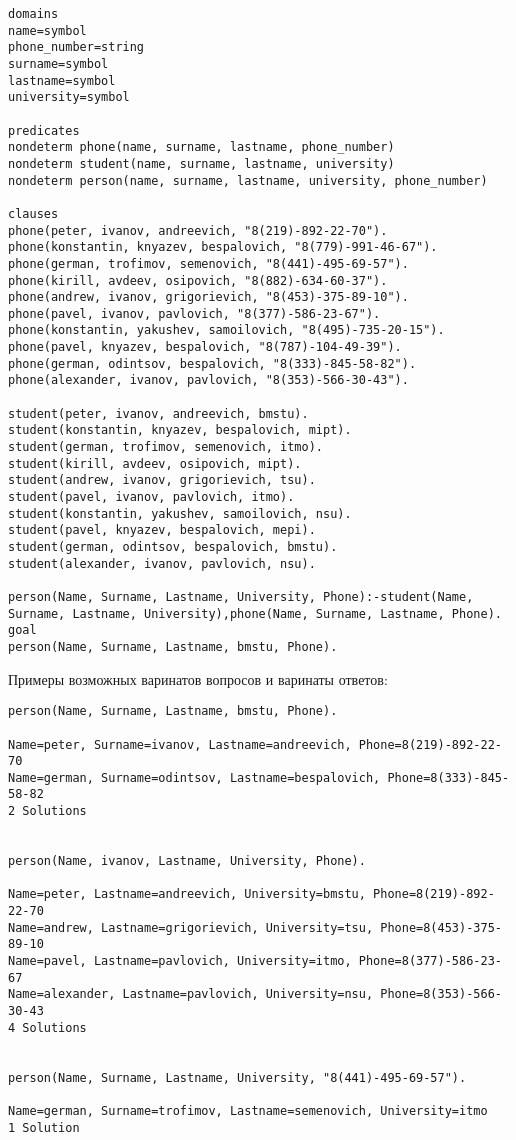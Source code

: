 \begin{lstlisting}
domains
name=symbol
phone_number=string
surname=symbol
lastname=symbol
university=symbol

predicates
nondeterm phone(name, surname, lastname, phone_number)
nondeterm student(name, surname, lastname, university)
nondeterm person(name, surname, lastname, university, phone_number)

clauses
phone(peter, ivanov, andreevich, "8(219)-892-22-70").
phone(konstantin, knyazev, bespalovich, "8(779)-991-46-67"). 
phone(german, trofimov, semenovich, "8(441)-495-69-57").     
phone(kirill, avdeev, osipovich, "8(882)-634-60-37").        
phone(andrew, ivanov, grigorievich, "8(453)-375-89-10").     
phone(pavel, ivanov, pavlovich, "8(377)-586-23-67").
phone(konstantin, yakushev, samoilovich, "8(495)-735-20-15").
phone(pavel, knyazev, bespalovich, "8(787)-104-49-39").      
phone(german, odintsov, bespalovich, "8(333)-845-58-82").    
phone(alexander, ivanov, pavlovich, "8(353)-566-30-43").
   
student(peter, ivanov, andreevich, bmstu).
student(konstantin, knyazev, bespalovich, mipt).
student(german, trofimov, semenovich, itmo).
student(kirill, avdeev, osipovich, mipt).
student(andrew, ivanov, grigorievich, tsu).
student(pavel, ivanov, pavlovich, itmo).
student(konstantin, yakushev, samoilovich, nsu).
student(pavel, knyazev, bespalovich, mepi).
student(german, odintsov, bespalovich, bmstu).
student(alexander, ivanov, pavlovich, nsu).

person(Name, Surname, Lastname, University, Phone):-student(Name, Surname, Lastname, University),phone(Name, Surname, Lastname, Phone).
goal	
person(Name, Surname, Lastname, bmstu, Phone).
\end{lstlisting}

Примеры возможных варинатов вопросов и варинаты ответов:
\begin{lstlisting}
person(Name, Surname, Lastname, bmstu, Phone).

Name=peter, Surname=ivanov, Lastname=andreevich, Phone=8(219)-892-22-70
Name=german, Surname=odintsov, Lastname=bespalovich, Phone=8(333)-845-58-82
2 Solutions


person(Name, ivanov, Lastname, University, Phone).

Name=peter, Lastname=andreevich, University=bmstu, Phone=8(219)-892-22-70
Name=andrew, Lastname=grigorievich, University=tsu, Phone=8(453)-375-89-10
Name=pavel, Lastname=pavlovich, University=itmo, Phone=8(377)-586-23-67
Name=alexander, Lastname=pavlovich, University=nsu, Phone=8(353)-566-30-43
4 Solutions


person(Name, Surname, Lastname, University, "8(441)-495-69-57").

Name=german, Surname=trofimov, Lastname=semenovich, University=itmo
1 Solution
\end{lstlisting}

